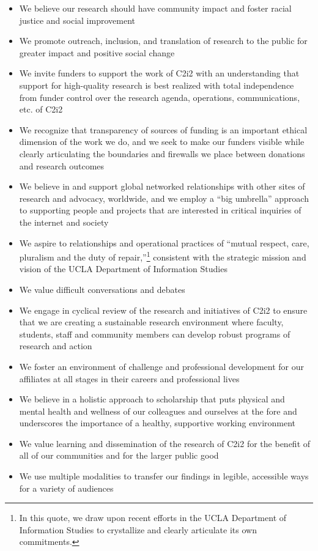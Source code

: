 \documentclass[11pt]{article}
\begin{document}
\begin{itemize}
\item	We believe our research should have community impact and foster racial justice and social improvement
\item	We promote outreach, inclusion, and translation of research to the public for greater impact and positive social change
\item	We invite funders to support the work of C2i2 with an understanding that support for high-quality research is best realized with total independence from funder control over the research agenda, operations, communications, etc. of C2i2
\item	We recognize that transparency of sources of funding is an important ethical dimension of the work we do, and we seek to make our funders visible while clearly articulating the boundaries and firewalls we place between donations and research outcomes
\item	We believe in and support global networked relationships with other sites of research and advocacy, worldwide, and we employ a “big umbrella” approach to supporting people and projects that are interested in critical inquiries of the internet and society
\item	We aspire to relationships and operational practices of “mutual respect, care, pluralism and the duty of repair,”\footnote{In this quote, we draw upon recent efforts in the UCLA Department of Information Studies to crystallize and clearly articulate its own commitments.}  consistent with the strategic mission and vision of the UCLA Department of Information Studies
\item	We value difficult conversations and debates
\item	We engage in cyclical review of the research and initiatives of C2i2 to ensure that we are creating a sustainable research environment where faculty, students, staff and community members can develop robust programs of research and action
\item	We foster an environment of challenge and professional development for our affiliates at all stages in their careers and professional lives
\item	We believe in a holistic approach to scholarship that puts physical and mental health and wellness of our colleagues and ourselves at the fore and underscores the importance of a healthy, supportive working environment
\item	We value learning and dissemination of the research of C2i2 for the benefit of all of our communities and for the larger public good 
\item	We use multiple modalities to transfer our findings in legible, accessible ways for a variety of audiences
\end{itemize}
\end{document}
